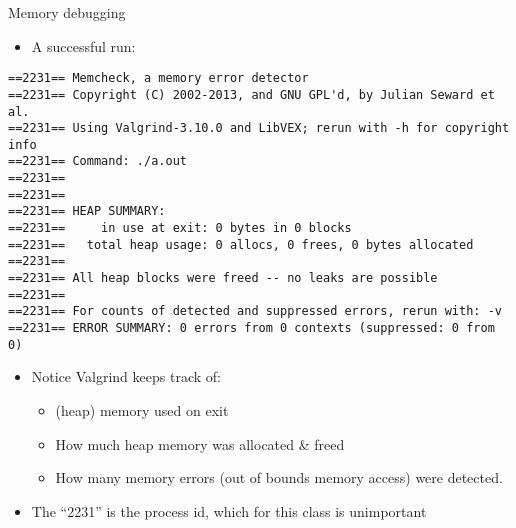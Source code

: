\documentclass{beamer}
\begin{document}
\begin{frame}[fragile]{Memory debugging}
\begin{itemize}
\item A successful run:
\end{itemize}
\begin{lstlisting}
==2231== Memcheck, a memory error detector
==2231== Copyright (C) 2002-2013, and GNU GPL'd, by Julian Seward et al.
==2231== Using Valgrind-3.10.0 and LibVEX; rerun with -h for copyright info
==2231== Command: ./a.out
==2231== 
==2231== 
==2231== HEAP SUMMARY:
==2231==     in use at exit: 0 bytes in 0 blocks
==2231==   total heap usage: 0 allocs, 0 frees, 0 bytes allocated
==2231== 
==2231== All heap blocks were freed -- no leaks are possible
==2231== 
==2231== For counts of detected and suppressed errors, rerun with: -v
==2231== ERROR SUMMARY: 0 errors from 0 contexts (suppressed: 0 from 0)
\end{lstlisting}
\begin{itemize}
\item Notice Valgrind keeps track of:
\begin{itemize}
\item (heap) memory used on exit
\item How much heap memory was allocated \& freed
\item How many memory errors (out of bounds memory access) were detected.
\end{itemize}
\item The ``2231'' is the process id, which for this class is unimportant
\end{itemize}
\end{frame}
\end{document}
